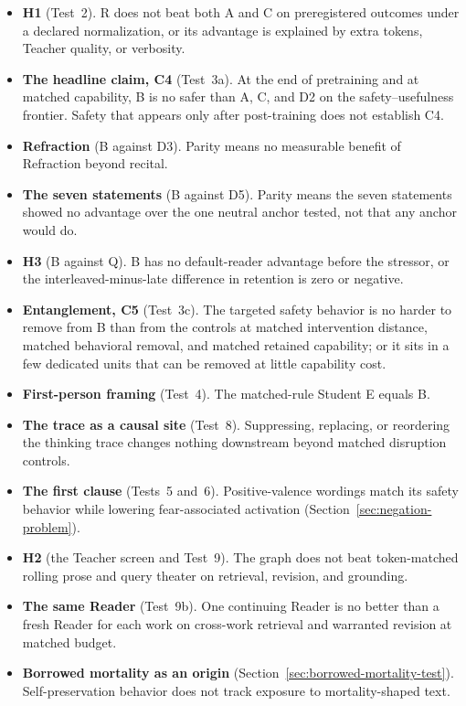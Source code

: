 \documentclass[11pt]{article}
\begin{document}
\begin{itemize}[leftmargin=*,itemsep=0.25em]
    \item \textbf{H1} (Test~2). R does not beat both A and C on preregistered
    outcomes under a declared normalization, or its advantage is explained by
    extra tokens, Teacher quality, or verbosity.
    \item \textbf{The headline claim, C4} (Test~3a). At the end of pretraining
    and at matched capability, B is no safer than A, C, and D2 on the
    safety--usefulness frontier. Safety that appears only after post-training
    does not establish C4.
    \item \textbf{Refraction} (B against D3). Parity means no measurable
    benefit of Refraction beyond recital.
    \item \textbf{The seven statements} (B against D5). Parity means the seven
    statements showed no advantage over the one neutral anchor tested, not that
    any anchor would do.
    \item \textbf{H3} (B against Q). B has no default-reader advantage before
    the stressor, or the interleaved-minus-late difference in retention is zero
    or negative.
    \item \textbf{Entanglement, C5} (Test~3c). The targeted safety behavior is
    no harder to remove from B than from the controls at matched intervention
    distance, matched behavioral removal, and matched retained capability; or
    it sits in a few dedicated units that can be removed at little capability
    cost.
    \item \textbf{First-person framing} (Test~4). The matched-rule Student E
    equals B.
    \item \textbf{The trace as a causal site} (Test~8). Suppressing, replacing,
    or reordering the thinking trace changes nothing downstream beyond matched
    disruption controls.
    \item \textbf{The first clause} (Tests~5 and~6). Positive-valence wordings
    match its safety behavior while lowering fear-associated activation
    (Section~\ref{sec:negation-problem}).
    \item \textbf{H2} (the Teacher screen and Test~9). The graph does not beat
    token-matched rolling prose and query theater on retrieval, revision, and
    grounding.
    \item \textbf{The same Reader} (Test~9b). One continuing Reader is no
    better than a fresh Reader for each work on cross-work retrieval and
    warranted revision at matched budget.
    \item \textbf{Borrowed mortality as an origin}
    (Section~\ref{sec:borrowed-mortality-test}). Self-preservation behavior
    does not track exposure to mortality-shaped text.
\end{itemize}
\end{document}
